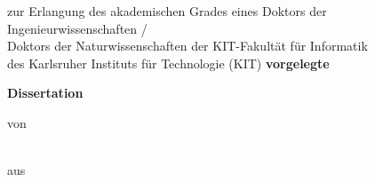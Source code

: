 \begin{titlepage}
\thispagestyle{empty}
\setlength{\unitlength}{1pt}


\newcommand{\tpsb}{\vskip 2.8cm}
\newcommand{\tpss}{\vskip 1.0cm}
\newcommand{\tpsm}{\vskip 0.5cm}



\begin{center}
\hbox{}

{\huge\bfseries \mytitle \par}
\tpss
zur Erlangung des akademischen Grades eines
\tpss
{\Large
Doktors der Ingenieurwissenschaften /
\\
Doktors der Naturwissenschaften
}
\tpss
der KIT-Fakultät für Informatik \\
des Karlsruher Instituts für Technologie (KIT)
\tpss
\textbf{vorgelegte} \\
\begin{large}\textbf{Dissertation}\end{large}
\tpsm
von
\tpsm
\begin{large}\textbf{\myname}\end{large} \\
aus \mycity
\tpss




\end{center}
\end{titlepage}
